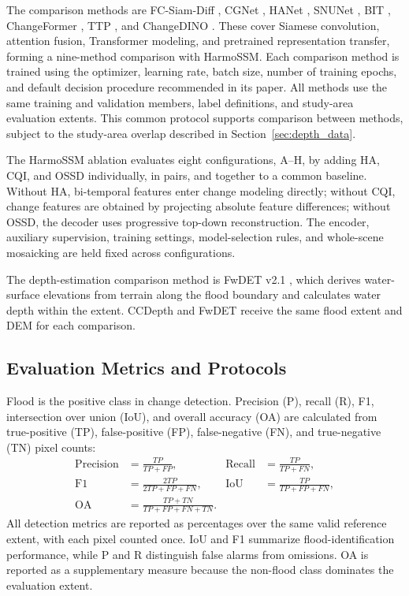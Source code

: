 \documentclass[authoryear,preprint,12pt]{elsarticle}
\begin{document}
The comparison methods are FC-Siam-Diff \citep{daudt2018fully}, CGNet \citep{han2023change}, HANet \citep{han2023hanet}, SNUNet \citep{fang2022snunet}, BIT \citep{chen2021remote}, ChangeFormer \citep{bandara2022changeformer}, TTP \citep{chen2023ttp}, and ChangeDINO \citep{cheng2025changedino}. These cover Siamese convolution, attention fusion, Transformer modeling, and pretrained representation transfer, forming a nine-method comparison with HarmoSSM. Each comparison method is trained using the optimizer, learning rate, batch size, number of training epochs, and default decision procedure recommended in its paper. All methods use the same training and validation members, label definitions, and study-area evaluation extents. This common protocol supports comparison between methods, subject to the study-area overlap described in Section~\ref{sec:depth_data}.

The HarmoSSM ablation evaluates eight configurations, A--H, by adding HA, CQI, and OSSD individually, in pairs, and together to a common baseline. Without HA, bi-temporal features enter change modeling directly; without CQI, change features are obtained by projecting absolute feature differences; without OSSD, the decoder uses progressive top-down reconstruction. The encoder, auxiliary supervision, training settings, model-selection rules, and whole-scene mosaicking are held fixed across configurations.

The depth-estimation comparison method is FwDET v2.1 \citep{cohen2022sensitivity}, which derives water-surface elevations from terrain along the flood boundary and calculates water depth within the extent. CCDepth and FwDET receive the same flood extent and DEM for each comparison.

\subsection{Evaluation Metrics and Protocols}\label{sec:experiment_metrics}

Flood is the positive class in change detection. Precision (P), recall (R), F1, intersection over union (IoU), and overall accuracy (OA) are calculated from true-positive (TP), false-positive (FP), false-negative (FN), and true-negative (TN) pixel counts:
\begin{align}
 \mathrm{Precision}&=\frac{TP}{TP+FP}, & \mathrm{Recall}&=\frac{TP}{TP+FN},\label{eq:precision}\\
 \mathrm{F1}&=\frac{2TP}{2TP+FP+FN}, & \mathrm{IoU}&=\frac{TP}{TP+FP+FN},\label{eq:f1}\\
 \mathrm{OA}&=\frac{TP+TN}{TP+FP+FN+TN}.\label{eq:oa}
\end{align}
All detection metrics are reported as percentages over the same valid reference extent, with each pixel counted once. IoU and F1 summarize flood-identification performance, while P and R distinguish false alarms from omissions. OA is reported as a supplementary measure because the non-flood class dominates the evaluation extent.
\end{document}
